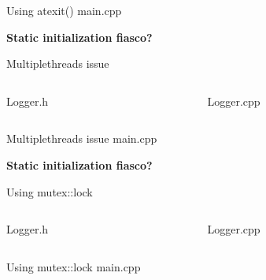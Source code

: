 \documentclass[13pt]{beamer}
\begin{document}
\begin{frame}{Using atexit()}
main.cpp
\lstset{basicstyle=\tiny,style=myCustomCppStyle}

\textbf{Static initialization fiasco?}
\end{frame}

\begin{frame}{Multiplethreads issue}
\begin{columns}[T]
\begin{column}{.48\textwidth}
Logger.h
\lstset{basicstyle=\tiny,style=myCustomCppStyle}

\end{column}

\begin{column}{.48\textwidth}
Logger.cpp
\lstset{basicstyle=\tiny,style=myCustomCppStyle}

\end{column}
\end{columns}
\end{frame}

\begin{frame}{Multiplethreads issue}
main.cpp
\lstset{basicstyle=\tiny,style=myCustomCppStyle}

\textbf{Static initialization fiasco?}
\end{frame}

\begin{frame}{Using mutex::lock}
\begin{columns}[T]
\begin{column}{.48\textwidth}
Logger.h
\lstset{basicstyle=\tiny,style=myCustomCppStyle}

\end{column}

\begin{column}{.48\textwidth}
Logger.cpp
\lstset{basicstyle=\tiny,style=myCustomCppStyle}

\end{column}
\end{columns}
\end{frame}

\begin{frame}{Using mutex::lock}
main.cpp
\lstset{basicstyle=\tiny,style=myCustomCppStyle}

\end{frame}
\end{document}
